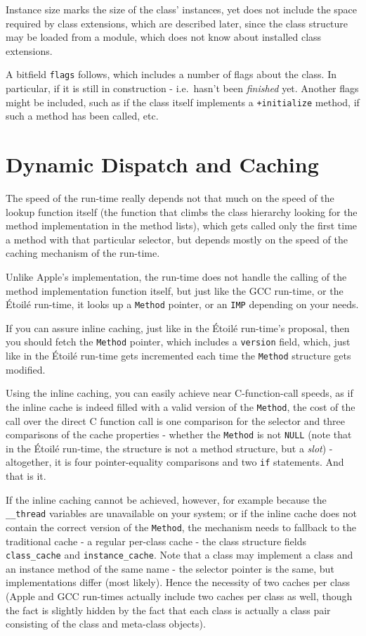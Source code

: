 Instance size marks the size of the class' instances, yet does not include the space required by class extensions, which are described later, since the class structure may be loaded from a module, which does not know about installed class extensions.

A bitfield \verb=flags= follows, which includes a number of flags about the class. In particular, if it is still in construction - i.e.\ hasn't been \emph{finished} yet. Another flags might be included, such as if the class itself implements a \verb=+initialize= method, if such a method has been called, etc.

\section{Dynamic Dispatch and Caching}

The speed of the run-time really depends not that much on the speed of the lookup function itself (the function that climbs the class hierarchy looking for the method implementation in the method lists), which gets called only the first time a method with that particular selector, but depends mostly on the speed of the caching mechanism of the run-time.

Unlike Apple's implementation, the run-time does not handle the calling of the method implementation function itself, but just like the GCC run-time, or the \'Etoil\'e run-time, it looks up a \verb=Method= pointer, or an \verb=IMP= depending on your needs.

If you can assure inline caching, just like in the \'Etoil\'e run-time's proposal, then you should fetch the \verb=Method= pointer, which includes a \verb=version= field, which, just like in the \'Etoil\'e run-time gets incremented each time the \verb=Method= structure gets modified.

Using the inline caching, you can easily achieve near C-function-call speeds, as if the inline cache is indeed filled with a valid version of the \verb=Method=, the cost of the call over the direct C function call is one comparison for the selector and three comparisons of the cache properties - whether the \verb=Method= is not \verb=NULL= (note that in the \'Etoil\'e run-time, the structure is not a method structure, but a \emph{slot}) - altogether, it is four pointer-equality comparisons and two \verb=if= statements. And that is it.

If the inline caching cannot be achieved, however, for example because the \verb=__thread= variables are unavailable on your system; or if the inline cache does not contain the correct version of the \verb=Method=, the mechanism needs to fallback to the traditional cache - a regular per-class cache - the class structure fields \verb=class_cache= and \verb=instance_cache=. Note that a class may implement a class and an instance method of the same name - the selector pointer is the same, but implementations differ (most likely). Hence the necessity of two caches per class (Apple and GCC run-times actually include two caches per class as well, though the fact is slightly hidden by the fact that each class is actually a class pair consisting of the class and meta-class objects).

